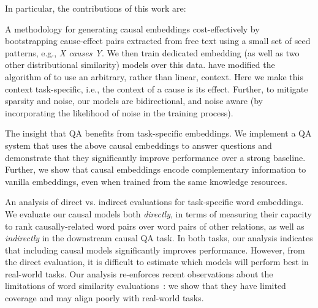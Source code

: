 In particular, the contributions of this work are:


{} 
A methodology for generating causal embeddings cost-effectively by bootstrapping cause-effect pairs extracted from free text using a small set of seed patterns, e.g., {\em X causes Y}. 
We then train dedicated embedding (as well as two other distributional similarity) models over this data. \citet{levy2014dependency} have modified the algorithm of\citet{mikolov2013distributed} to use an arbitrary, rather than linear, context. Here we make this context task-specific, i.e., the context of a cause is its effect.
Further, to mitigate sparsity and noise, our models are bidirectional, and noise aware (by incorporating the likelihood of noise in the training process). 

{} The insight that QA benefits from task-specific embeddings. %
We implement a QA system that uses the above causal embeddings to answer questions and demonstrate that they significantly improve performance over a strong baseline. Further, we show that causal embeddings encode complementary information to vanilla embeddings, even when trained from the same knowledge resources. 

{} An analysis of direct vs. indirect evaluations for task-specific word embeddings. 
We evaluate our causal models both  {\em directly}, in terms of measuring their capacity to rank causally-related word pairs over word pairs of other relations, as well as {\em indirectly} in the downstream causal QA task. 
In both tasks, our analysis indicates that including causal models significantly improves performance. 
However, from the direct evaluation, it is difficult to estimate which models will perform best in real-world tasks. Our analysis re-enforces recent observations about the limitations of word similarity evaluations~\cite{faruqui2016problems}: we show that they have limited coverage and may align poorly with real-world tasks.

